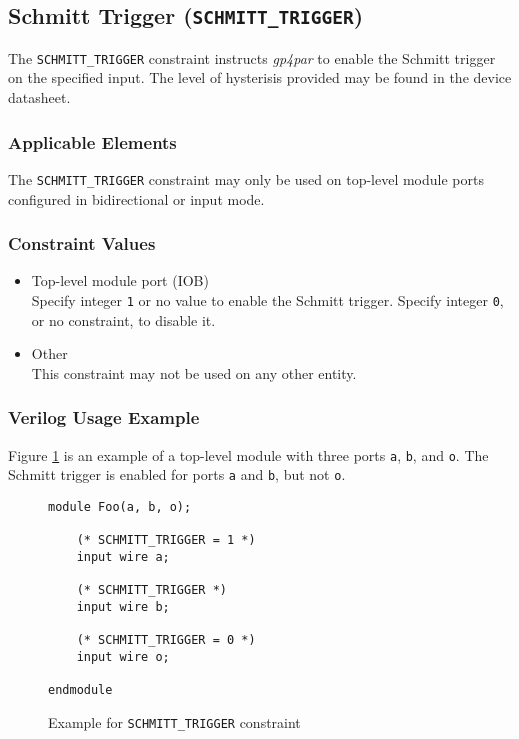 \documentclass[11pt]{article}
\newcommand{\namestyle}[1]{\textit{#1}}
\newcommand{\tokenstyle}[1]{\texttt{#1}}
\newcommand{\wirestyle}[1]{\texttt{#1}}
\newcommand{\valuestyle}[1]{\texttt{#1}}
\newcommand{\whenstyle}[1]{{\fontseries{sb}\selectfont#1}}
\begin{document}

\pagebreak
\subsection{Schmitt Trigger (\tokenstyle{SCHMITT\_TRIGGER})}

The \tokenstyle{SCHMITT\_TRIGGER} constraint instructs \namestyle{gp4par} to enable the Schmitt trigger on the specified input. The level
of hysterisis provided may be found in the device datasheet.

\subsubsection{Applicable Elements}
The \tokenstyle{SCHMITT\_TRIGGER} constraint may only be used on top-level module ports configured in bidirectional or input mode.

\subsubsection{Constraint Values}
\begin{itemize}
\item \whenstyle{Top-level module port (IOB)}\\
Specify integer \valuestyle{1} or no value to enable the Schmitt trigger. Specify integer \valuestyle{0}, or no
constraint, to disable it.
\item \whenstyle{Other} \\
This constraint may not be used on any other entity.
\end{itemize}

\subsubsection{Verilog Usage Example}

Figure \ref{constraint-schmitt} is an example of a top-level module with three ports \wirestyle{a}, \wirestyle{b}, and
\wirestyle{o}. The Schmitt trigger is enabled for ports  \wirestyle{a} and \wirestyle{b}, but not \wirestyle{o}.

\begin{figure}[h]
\begin{lstlisting}
module Foo(a, b, o);

	(* SCHMITT_TRIGGER = 1 *)
	input wire a;

	(* SCHMITT_TRIGGER *)
	input wire b;

	(* SCHMITT_TRIGGER = 0 *)
	input wire o;

endmodule
\end{lstlisting}
\caption{Example for \tokenstyle{SCHMITT\_TRIGGER} constraint}
\label{constraint-schmitt}
\end{figure}
\end{document}
